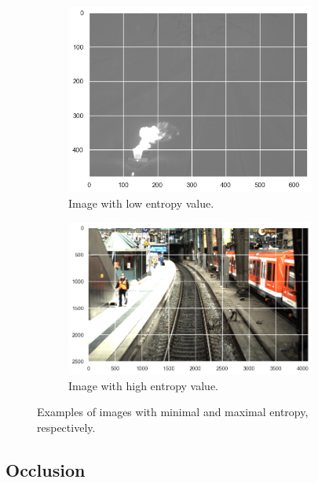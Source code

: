 \documentclass[Master,MDS,english]{BASE/twbook} %
\begin{document}
\begin{figure}[H]
\centering
\begin{subfigure}[t]{.5\textwidth}
  \centering
  \includegraphics[width=0.9\textwidth]{images/datasets/db/low_entropy}
  \caption{Image with low entropy value.}
  \label{fig:entropy_sub1}
\end{subfigure}%
\begin{subfigure}[t]{.5\textwidth}
  \centering
  \includegraphics[width=0.9\textwidth]{images/datasets/db/high_entropy}
  \caption{Image with high entropy value.}
 \label{fig:entropy_sub2}
\end{subfigure}
\caption{Examples of images with minimal and maximal entropy, respectively.}
\label{fig:entropy_examples}
\end{figure}


\subsection{Occlusion}
\end{document}
